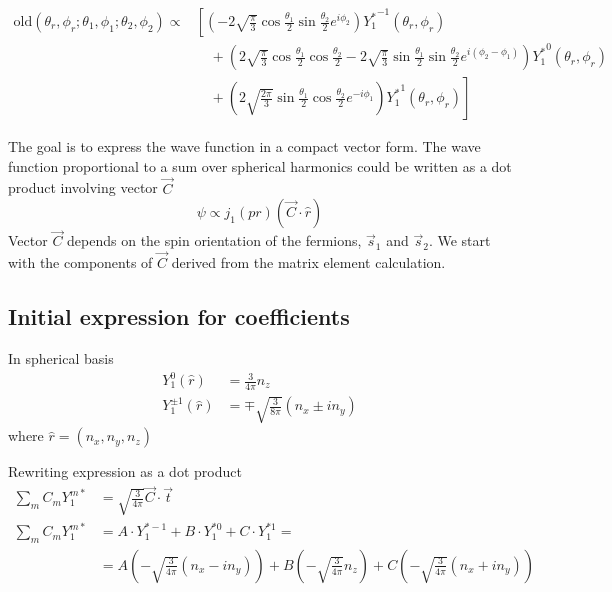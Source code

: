 \documentclass[12pt]{article}
\begin{document}
    \[
    \begin{aligned}
    \text{old}\left(\theta_r, \phi_r; \theta_1, \phi_1; \theta_2, \phi_2\right) \propto &\left[\left(-2 \sqrt{\frac{\pi}{3}} \cos \frac{\theta_1}{2} \sin \frac{\theta_2}{2} e^{i \phi_2}\right) {Y^*_{1}}^{-1}(\theta_r, \phi_r) \right. \\
    &\quad + \left(2 \sqrt{\frac{\pi}{3}} \cos \frac{\theta_1}{2} \cos \frac{\theta_2}{2}  - 2 \sqrt{\frac{\pi}{3}} \sin \frac{\theta_1}{2} \sin \frac{\theta_2}{2} e^{i(\phi_2 - \phi_1)}\right) {Y^*_{1}}^{0}(\theta_r, \phi_r) \\
    &\quad + \left.\left(2 \sqrt{\frac{2 \pi}{3}} \sin \frac{\theta_1}{2} \cos \frac{\theta_2}{2} e^{-i \phi_1} \right){Y^*_{1}}^{1}(\theta_r, \phi_r)  \right]
    \end{aligned}
    \]

	The goal is to express the wave function in a compact vector form. The wave function proportional to a sum over spherical harmonics could be written as a dot product involving vector $\vec{C}$
	\[
	\psi \propto j_1 (pr) \left(\vec{C} \cdot \hat{r}\right)
	\]
	Vector $\vec{C}$ depends on the spin orientation of the fermions, $\vec{s}_1$ and $\vec{s}_2$. We start with the components of $\vec{C}$ derived from the matrix element calculation.

	\subsection{Initial expression for coefficients}
    In spherical basis
    \[
    \begin{aligned}
    	Y^0_1 (\hat{r}) &= \frac{3}{4 \pi} n_z \\
    	Y^{\pm1}_{1} (\hat{r}) &= \mp \sqrt{\frac{3}{8 \pi}} (n_x \pm i n_y)
    \end{aligned}
    \]
    where $\hat{r} = (n_x, n_y, n_z)$
    
    Rewriting expression as a dot product
    \[
    \begin{aligned}
    	\sum_{m} C_m Y^{m*}_1 &= \sqrt{\frac{3}{4 \pi}} \vec{C} \cdot \vec{t} \\
    	\sum_{m} C_m Y^{m*}_1 &= A \cdot Y^{* -1}_1 + B \cdot Y^{* 0}_1 + C \cdot Y^{* 1}_1 = \\
    	&= A \left(- \sqrt{\frac{3}{4 \pi}} (n_x -i n_y)\right) + B \left(- \sqrt{\frac{3}{4 \pi}} n_z \right) + C \left(- \sqrt{\frac{3}{4 \pi}} (n_x + i n_y)\right)
    \end{aligned}
    \]
    
\end{document}
